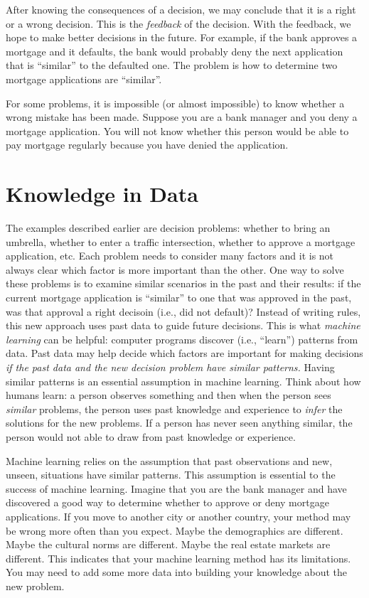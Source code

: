 
After knowing the consequences of a decision, we may conclude that it
is a right or a wrong decision. This is the {\it feedback} of the
decision.  With the feedback, we hope to make better decisions in the
future. For example, if the bank approves a mortgage and it defaults,
the bank would probably deny the next application that is ``similar''
to the defaulted one.  The problem is how to determine two mortgage
applications are ``similar''.

For some problems, it is impossible (or almost impossible) to know
whether a wrong mistake has been made. Suppose you are a bank manager
and you deny a mortgage application. You will not know whether this
person would be able to pay mortgage regularly because you have denied
the application.



\section{Knowledge in Data}


The examples described earlier are decision problems: whether to bring
an umbrella, whether to enter a traffic intersection, whether to
approve a mortgage application, etc. Each problem needs to consider
many factors and it is not always clear which factor is more important
than the other. One way to solve these problems is to examine similar
scenarios in the past and their results: if the current mortgage
application is ``similar'' to one that was approved in the past, was
that approval a right decisoin (i.e., did not default)?  Instead of
writing rules, this new approach uses past data to guide future
decisions.  This is what {\it machine learning} can be helpful:
computer programs discover (i.e., ``learn'') patterns from data.  Past
data may help decide which factors are important for making decisions
{\it if the past data and the new decision problem have similar
  patterns.}  Having similar patterns is an essential assumption in
machine learning.  Think about how humans learn: a person observes
something and then when the person sees {\it similar} problems, the
person uses past knowledge and experience to {\it infer} the solutions
for the new problems.  If a person has never seen anything similar,
the person would not able to draw from past knowledge or experience.

Machine learning relies on the assumption that past observations and
new, unseen, situations have similar patterns.  This assumption is
essential to the success of machine learning.  Imagine that you are
the bank manager and have discovered a good way to determine whether
to approve or deny mortgage applications.  If you move to another city
or another country, your method may be wrong more often than you
expect. Maybe the demographics are different. Maybe the cultural norms
are different.  Maybe the real estate markets are different.  This
indicates that your machine learning method has its limitations.  You
may need to add some more data into building your knowledge about the
new problem.


